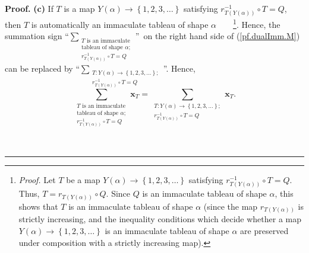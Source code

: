 \documentclass
[numbers=enddot,12pt,final,onecolumn,notitlepage,abstracton]{scrartcl}%
\theoremstyle{definition}
\newenvironment{proof}[1][Proof]{\noindent\textbf{#1.} }{\ \rule{0.5em}{0.5em}}
\let\sumnonlimits\sum
\renewcommand{\sum}{\sumnonlimits\limits}
\begin{document}
\begin{proof}
\textbf{(c)} If $T$ is a map $Y\left(  \alpha\right)  \rightarrow\left\{
1,2,3,\ldots\right\}  $ satisfying $r_{T\left(  Y\left(  \alpha\right)
\right)  }^{-1}\circ T=Q$, then $T$ is automatically an immaculate tableau of
shape $\alpha$\ \ \ \ \footnote{\textit{Proof.} Let $T$ be a map $Y\left(
\alpha\right)  \rightarrow\left\{  1,2,3,\ldots\right\}  $ satisfying
$r_{T\left(  Y\left(  \alpha\right)  \right)  }^{-1}\circ T=Q$. Thus,
$T=r_{T\left(  Y\left(  \alpha\right)  \right)  }\circ Q$. Since $Q$ is an
immaculate tableau of shape $\alpha$, this shows that $T$ is an immaculate
tableau of shape $\alpha$ (since the map $r_{T\left(  Y\left(  \alpha\right)
\right)  }$ is strictly increasing, and the inequality conditions which decide
whether a map $Y\left(  \alpha\right)  \rightarrow\left\{  1,2,3,\ldots
\right\}  $ is an immaculate tableau of shape $\alpha$ are preserved under
composition with a strictly increasing map).}. Hence, the summation sign
\textquotedblleft$\sum_{\substack{T\text{ is an immaculate}\\\text{tableau of
shape }\alpha;\\r_{T\left(  Y\left(  \alpha\right)  \right)  }^{-1}\circ
T=Q}}$\textquotedblright\ on the right hand side of (\ref{pf.dualImm.M}) can
be replaced by \textquotedblleft$\sum_{\substack{T:Y\left(  \alpha\right)
\rightarrow\left\{  1,2,3,\ldots\right\}  ;\\r_{T\left(  Y\left(
\alpha\right)  \right)  }^{-1}\circ T=Q}}$\textquotedblright. Hence,%
\[
\sum_{\substack{T\text{ is an immaculate}\\\text{tableau of shape }%
\alpha;\\r_{T\left(  Y\left(  \alpha\right)  \right)  }^{-1}\circ
T=Q}}\mathbf{x}_{T}=\sum_{\substack{T:Y\left(  \alpha\right)  \rightarrow
\left\{  1,2,3,\ldots\right\}  ;\\r_{T\left(  Y\left(  \alpha\right)  \right)
}^{-1}\circ T=Q}}\mathbf{x}_{T}.
\]



\end{proof}
\end{document}
